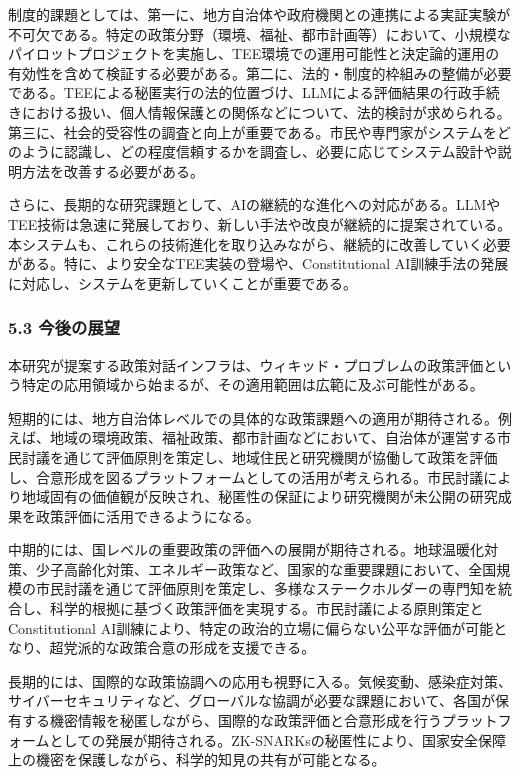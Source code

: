 制度的課題としては、第一に、地方自治体や政府機関との連携による実証実験が不可欠である。特定の政策分野（環境、福祉、都市計画等）において、小規模なパイロットプロジェクトを実施し、TEE環境での運用可能性と決定論的運用の有効性を含めて検証する必要がある。第二に、法的・制度的枠組みの整備が必要である。TEEによる秘匿実行の法的位置づけ、LLMによる評価結果の行政手続きにおける扱い、個人情報保護との関係などについて、法的検討が求められる。第三に、社会的受容性の調査と向上が重要である。市民や専門家がシステムをどのように認識し、どの程度信頼するかを調査し、必要に応じてシステム設計や説明方法を改善する必要がある。

さらに、長期的な研究課題として、AIの継続的な進化への対応がある。LLMやTEE技術は急速に発展しており、新しい手法や改良が継続的に提案されている。本システムも、これらの技術進化を取り込みながら、継続的に改善していく必要がある。特に、より安全なTEE実装の登場や、Constitutional AI訓練手法の発展に対応し、システムを更新していくことが重要である。

\subsubsection{5.3 今後の展望}\label{ux4ecaux5f8cux306eux5c55ux671b}

本研究が提案する政策対話インフラは、ウィキッド・プロブレムの政策評価という特定の応用領域から始まるが、その適用範囲は広範に及ぶ可能性がある。

短期的には、地方自治体レベルでの具体的な政策課題への適用が期待される。例えば、地域の環境政策、福祉政策、都市計画などにおいて、自治体が運営する市民討議を通じて評価原則を策定し、地域住民と研究機関が協働して政策を評価し、合意形成を図るプラットフォームとしての活用が考えられる。市民討議により地域固有の価値観が反映され、秘匿性の保証により研究機関が未公開の研究成果を政策評価に活用できるようになる。

中期的には、国レベルの重要政策の評価への展開が期待される。地球温暖化対策、少子高齢化対策、エネルギー政策など、国家的な重要課題において、全国規模の市民討議を通じて評価原則を策定し、多様なステークホルダーの専門知を統合し、科学的根拠に基づく政策評価を実現する。市民討議による原則策定とConstitutional AI訓練により、特定の政治的立場に偏らない公平な評価が可能となり、超党派的な政策合意の形成を支援できる。

長期的には、国際的な政策協調への応用も視野に入る。気候変動、感染症対策、サイバーセキュリティなど、グローバルな協調が必要な課題において、各国が保有する機密情報を秘匿しながら、国際的な政策評価と合意形成を行うプラットフォームとしての発展が期待される。ZK-SNARKsの秘匿性により、国家安全保障上の機密を保護しながら、科学的知見の共有が可能となる。

